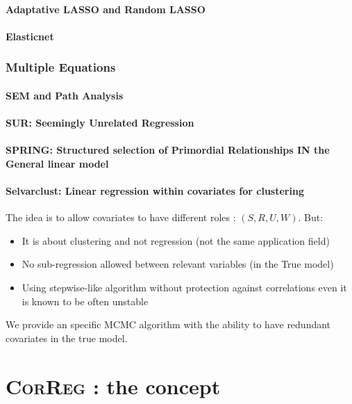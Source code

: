 \documentclass[11pt,a4paper]{report}
\begin{document}
		\subsection{Adaptative LASSO and Random LASSO}
			\cite{zou2006adaptive}%
			\cite{wang2011random}%
		\subsection{Elasticnet}
			\cite{zou2005regularization}
	\section{Multiple Equations}
		\subsection{SEM and Path Analysis}
		\subsection{SUR: Seemingly Unrelated Regression}
			\cite{SURzellner}
		\subsection{SPRING: Structured selection of Primordial Relationships IN the General linear model}
			\cite{chiquetconf}			
			
		\subsection{Selvarclust: Linear regression within covariates for clustering}
			\cite{maugis2009variable}
			The idea is to allow covariates to have different roles : $(S,R,U,W)$.
			But:
			\begin{itemize}
				\item It is about clustering and not regression (not the same application field)
				\item No sub-regression allowed between relevant variables (in the True model)
				\item Using stepwise-like algorithm without protection against correlations \cite{raftery2006variable} even it is known to be often unstable \cite{miller2002subset}
			\end{itemize}	
			We provide an specific MCMC algorithm with the ability to have redundant covariates in the true model.		 
\part{\textsc{CorReg} : the concept}
\end{document}
